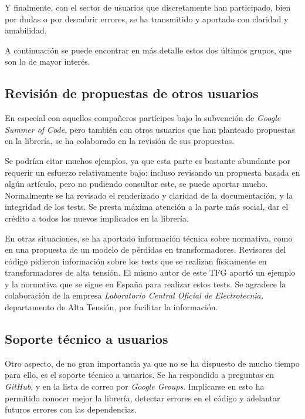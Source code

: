 Y finalmente, con el sector de usuarios que discretamente han participado, bien por dudas o por descubrir errores, se ha transmitido y aportado con claridad y amabilidad.

A continuación se puede encontrar en más detalle estos dos últimos grupos, que son lo de mayor interés.

\subsection{Revisión de propuestas de otros usuarios}

En especial con aquellos compañeros partícipes bajo la subvención de \textit{Google Summer of Code}, pero también con otros usuarios que han planteado propuestas en la librería, se ha colaborado en la revisión de sus propuestas.

Se podrían citar muchos ejemplos, ya que esta parte es bastante abundante por requerir un esfuerzo relativamente bajo: incluso revisando un propuesta basada en algún artículo, pero no pudiendo consultar este, se puede aportar mucho. Normalmente se ha revisado el renderizado y claridad de la documentación, y la integridad de los tests. Se presta máxima atención a la parte más social, dar el crédito a todos los nuevos implicados en la librería.

En otras situaciones, se ha aportado información técnica sobre normativa, como en una propuesta de un modelo de pérdidas en transformadores. Revisores del código pidieron información sobre los tests que se realizan físicamente en transformadores de alta tensión. El mismo autor de este TFG aportó un ejemplo y la normativa que se sigue en España para realizar estos tests. Se agradece la colaboración de la empresa \textit{Laboratorio Central Oficial de Electrotecnia,} departamento de Alta Tensión, por facilitar la información.

\subsection{Soporte técnico a usuarios} \label{sct:desarrollo:soporte_tecnico}

Otro aspecto, de no gran importancia ya que no se ha dispuesto de mucho tiempo para ello, es el soporte técnico a usuarios. Se ha respondido a preguntas en \textit{GitHub}, y en la lista de correo por \textit{Google Groups}. Implicarse en esto ha permitido conocer mejor la librería, detectar errores en el código y adelantar futuros errores con las dependencias.

